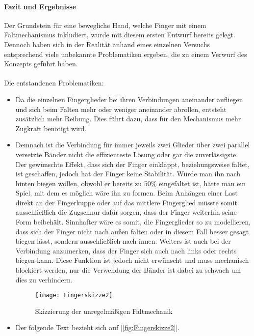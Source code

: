 \documentclass[titlepage,12pt,twoside]{article}
\begin{document}
\paragraph{Fazit und Ergebnisse}
\label{par:Fazit und Ergebnisse}
\hfill \break
\hfill \break
Der Grundstein für eine bewegliche Hand, welche Finger mit einem 
Faltmechanismus inkludiert, wurde mit diesem ersten Entwurf bereits gelegt. 
Dennoch haben sich in der Realität anhand eines einzelnen Versuchs 
entsprechend viele unbekannte Problematiken ergeben, die zu einem Verwurf des 
Konzepts geführt haben. \\
\\
Die entstandenen Problematiken:
\begin{itemize}
	\item Da die einzelnen Fingerglieder bei ihren Verbindungen aneinander 
	aufliegen und sich beim Falten mehr oder weniger aneinander abrollen, 
	entsteht zusätzlich mehr Reibung. Dies führt dazu, dass für den Mechanismus mehr Zugkraft benötigt wird.
	\item Demnach ist die Verbindung für immer jeweils zwei Glieder über zwei 
	parallel versetzte Bänder nicht die effizienteste Lösung oder gar die zuverlässigste. 
	Der gewünschte Effekt, dass sich der Finger einklappt, beziehungsweise 
	faltet, ist geschaffen, jedoch hat der Finger keine Stabilität. Würde man 
	ihn nach hinten biegen wollen, obwohl er bereits zu 50\% eingefaltet ist, 
	hätte man ein Spiel, mit dem es möglich wäre ihn zu formen. Beim Anhängen 
	einer Last direkt an der Fingerkuppe oder auf das mittlere Fingerglied 
	müsste somit ausschließlich die Zugschnur dafür sorgen, dass der Finger 
	weiterhin seine Form beibehält. Sinnhafter wäre es somit, die Fingerglieder 
	so zu modellieren, dass sich der Finger nicht nach außen falten oder in 
	diesem Fall besser gesagt biegen lässt, sondern ausschließlich nach innen. 
	Weiters ist auch bei der Verbindung anzumerken, dass der Finger sich auch 
	nach links oder rechts biegen kann. Diese Funktion ist jedoch nicht 
	erwünscht und muss mechanisch blockiert werden, nur die Verwendung der 
	Bänder ist dabei zu schwach um dies zu verhindern.
	\begin{figure}[H]
		\begin{center}
			\scalebox{1.2}
			{\texttt{[image: Fingerskizze2]}}
			\caption{Skizzierung der unregelmäßigen Faltmechanik}
			\label{fig:Fingerskizze2}			
		\end{center}
	\end{figure}
	\hfill \break
	\item Der folgende Text bezieht sich auf [\textcolor{blue}{\autoref{fig:Fingerskizze2}}]. \\

\end{itemize}
\end{document}
